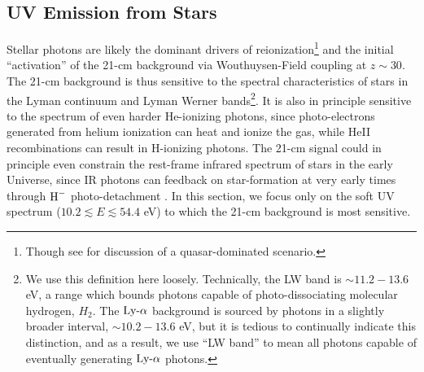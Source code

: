 \subsection{UV Emission from Stars} \label{sec:UV}
Stellar photons are likely the dominant drivers of reionization\footnote{Though see \cite{Madau2015} for discussion of a quasar-dominated scenario.} and the initial ``activation'' of the 21-cm background via Wouthuysen-Field coupling at $z \sim 30$. The 21-cm background is thus sensitive to the spectral characteristics of stars in the Lyman continuum and Lyman Werner bands\footnote{We use this definition here loosely. Technically, the LW band is $\sim 11.2-13.6$ eV, a range which bounds photons capable of photo-dissociating molecular hydrogen, $H_2$. The $\text{Ly-}\alpha$ background is sourced by photons in a slightly broader interval, $\sim 10.2-13.6$ eV, but it is tedious to continually indicate this distinction, and as a result, we use ``LW band'' to mean all photons capable of eventually generating $\text{Ly-}\alpha$ photons.}. It is also in principle sensitive to the spectrum of even harder He-ionizing photons, since photo-electrons generated from helium ionization can heat and ionize the gas, while HeII recombinations can result in H-ionizing photons. The 21-cm signal could in principle even constrain the rest-frame infrared spectrum of stars in the early Universe, since IR photons can feedback on star-formation at very early times through $\text{H}^{-}$ photo-detachment \cite{WolcottGreen2012}. In this section, we focus only on the soft UV spectrum ($10.2 \lesssim E \lesssim 54.4$ eV) to which the 21-cm background is most sensitive.

